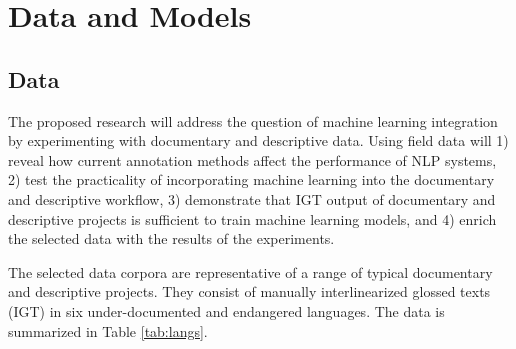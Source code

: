 \chapter{Data and Models}
\label{chap:datamodels}

\section{Data}

The proposed research will address the question of machine learning integration by experimenting with documentary and descriptive data. Using field data will 1) reveal how current annotation methods affect the performance of NLP systems, 2) test the practicality of incorporating machine learning into the documentary and descriptive workflow, 3) demonstrate that IGT output of documentary and descriptive projects is sufficient to train machine learning models, and 4) enrich the selected data with the results of the experiments.

The selected data corpora are representative of a range of typical documentary and descriptive projects. They consist of manually interlinearized glossed texts (IGT) in six under-documented and endangered languages. The data is summarized in Table \ref{tab:langs}.   

